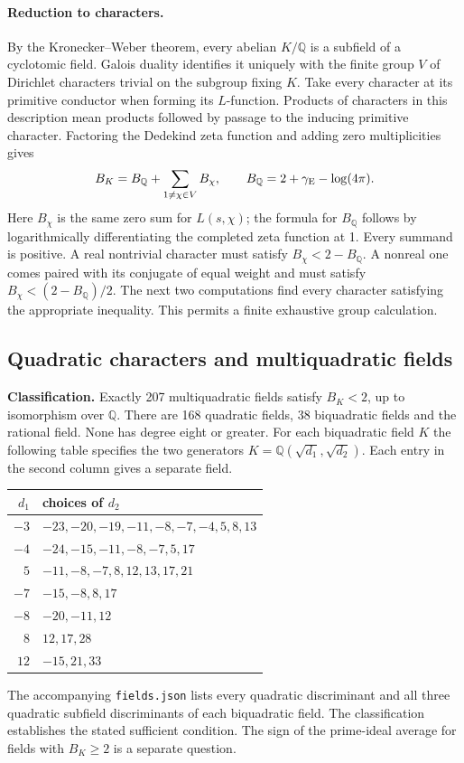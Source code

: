 \documentclass[11pt]{article}
\newcommand{\Q}{\mathbb Q}\newcommand{\R}{\mathbb R}
\begin{document}
\paragraph{Reduction to characters.}
By the Kronecker--Weber theorem, every abelian $K/\Q$ is a subfield of a cyclotomic field. Galois duality identifies it uniquely with the finite group $V$ of Dirichlet characters trivial on the subgroup fixing $K$. Take every character at its primitive conductor when forming its $L$-function. Products of characters in this description mean products followed by passage to the inducing primitive character. Factoring the Dedekind zeta function and adding zero multiplicities gives
\[
       B_K=B_{\Q}+\sum_{1\ne\chi\in V}B_\chi,
       \qquad B_{\Q}=2+\gamma_{\rm E}-\log(4\pi).
\]
Here $B_\chi$ is the same zero sum for $L(s,\chi)$; the formula for $B_\Q$ follows by logarithmically differentiating the completed zeta function at 1. Every summand is positive. A real nontrivial character must satisfy $B_\chi<2-B_\Q$. A nonreal one comes paired with its conjugate of equal weight and must satisfy $B_\chi<(2-B_\Q)/2$. The next two computations find every character satisfying the appropriate inequality. This permits a finite exhaustive group calculation.



\subsection{Quadratic characters and multiquadratic fields}
\smallskip\noindent\textbf{Classification.}
Exactly 207 multiquadratic fields satisfy $B_K<2$, up to isomorphism over
$\mathbb Q$. There are 168 quadratic fields, 38 biquadratic fields and the
rational field. None has degree eight or greater. For each biquadratic field
$K$ the following table specifies the two generators
$K=\mathbb Q(\sqrt{d_1},\sqrt{d_2})$. Each entry in the second column
gives a separate field.
\begin{center}
\begin{tabular}{r|l}
$d_1$ & choices of $d_2$ \\ \hline
$-3$ & $-23,-20,-19,-11,-8,-7,-4,5,8,13$ \\
$-4$ & $-24,-15,-11,-8,-7,5,17$ \\
$5$  & $-11,-8,-7,8,12,13,17,21$ \\
$-7$ & $-15,-8,8,17$ \\
$-8$ & $-20,-11,12$ \\
$8$  & $12,17,28$ \\
$12$ & $-15,21,33$
\end{tabular}
\end{center}
The accompanying \texttt{fields.json} lists every quadratic discriminant
and all three quadratic subfield discriminants of each biquadratic field.
The classification establishes the stated sufficient condition. The sign
of the prime-ideal average for fields with $B_K\ge2$ is a separate question.
\end{document}
